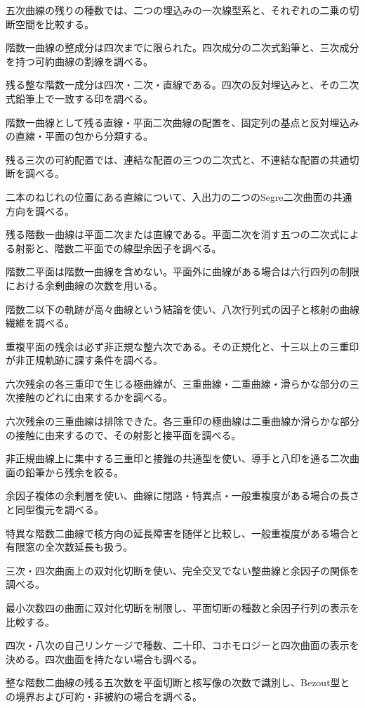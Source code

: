 \documentclass[11pt,a4paper]{ltjsarticle}
\begin{document}
五次曲線の残りの種数では、二つの埋込みの一次線型系と、それぞれの二乗の切断空間を比較する。

階数一曲線の整成分は四次までに限られた。四次成分の二次式鉛筆と、三次成分を持つ可約曲線の割線を調べる。

残る整な階数一成分は四次・二次・直線である。四次の反対埋込みと、その二次式鉛筆上で一致する印を調べる。

階数一曲線として残る直線・平面二次曲線の配置を、固定列の基点と反対埋込みの直線・平面の包から分類する。

残る三次の可約配置では、連結な配置の三つの二次式と、不連結な配置の共通切断を調べる。

二本のねじれの位置にある直線について、入出力の二つのSegre二次曲面の共通方向を調べる。

残る階数一曲線は平面二次または直線である。平面二次を消す五つの二次式による射影と、階数二平面での線型余因子を調べる。

階数二平面は階数一曲線を含めない。平面外に曲線がある場合は六行四列の制限における余剰曲線の次数を用いる。

階数二以下の軌跡が高々曲線という結論を使い、八次行列式の因子と核射の曲線繊維を調べる。

重複平面の残余は必ず非正規な整六次である。その正規化と、十三以上の三重印が非正規軌跡に課す条件を調べる。

六次残余の各三重印で生じる極曲線が、三重曲線・二重曲線・滑らかな部分の三次接触のどれに由来するかを調べる。

六次残余の三重曲線は排除できた。各三重印の極曲線は二重曲線か滑らかな部分の接触に由来するので、その射影と接平面を調べる。

非正規曲線上に集中する三重印と接錐の共通型を使い、導手と八印を通る二次曲面の鉛筆から残余を絞る。

余因子複体の余剰層を使い、曲線に閉路・特異点・一般重複度がある場合の長さと同型復元を調べる。

特異な階数二曲線で核方向の延長障害を随伴と比較し、一般重複度がある場合と有限窓の全次数延長も扱う。

三次・四次曲面上の双対化切断を使い、完全交叉でない整曲線と余因子の関係を調べる。

最小次数四の曲面に双対化切断を制限し、平面切断の種数と余因子行列の表示を比較する。

四次・八次の自己リンケージで種数、二十印、コホモロジーと四次曲面の表示を決める。四次曲面を持たない場合も調べる。

整な階数二曲線の残る五次数を平面切断と核写像の次数で識別し、Bezout型との境界および可約・非被約の場合を調べる。
\end{document}
